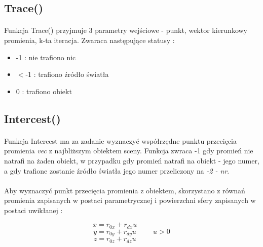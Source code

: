 \documentclass[wide,a4paper,titlepage,12pt] {article}
\begin{document}
\subsection{Trace()}
\paragraph{} %
\label{par:}
Funkcja Trace() przyjmuje 3 parametry wejściowe - punkt, wektor kierunkowy promienia, k-ta iteracja. Zwaraca następujące statusy : 
\begin{itemize}
	\item -1 : nie trafiono nic
	\item $<$-1 : trafiono źródło światła
	\item 0 : trafiono obiekt
\end{itemize}
 
\subsection{Intercest()} %
\paragraph{}
Funkcja Intercest ma za zadanie wyznaczyć współrzędne punktu przecięcia promienia \textit{vec} z najbliższym obiektem sceny. Funkcja zwraca -1 gdy promień nie natrafi na żaden obiekt, w przypadku gdy promień natrafi na obiekt - jego numer, a gdy trafione zostanie źródło światła jego numer przeliczony na \textit{-2 - nr}.
\paragraph{}
Aby wyznaczyć punkt przecięcia promienia z obiektem, skorzystano z równań promienia zapisanych w postaci parametrycznej i powierzchni sfery zapisanych w postaci uwikłanej : 

\begin{equation}
x = r_{0x} + r_{dx}u \hspace{2cm}
\end{equation}
\begin{equation}
y = r_{0y} + r_{dy}u \hspace{1cm} u > 0
\end{equation}
\begin{equation}
z = r_{0z} + r_{dz}u \hspace{2cm}
\end{equation}
\end{document}
